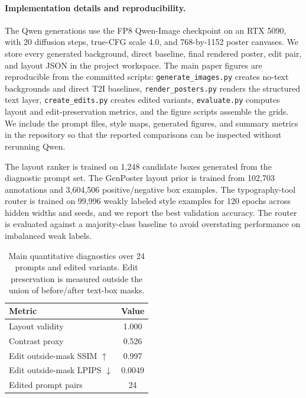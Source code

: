 \documentclass[10pt,twocolumn,letterpaper]{article}
\begin{document}
\paragraph{Implementation details and reproducibility.}
The Qwen generations use the FP8 Qwen-Image checkpoint on an RTX 5090, with 20 diffusion steps, true-CFG scale 4.0, and 768-by-1152 poster canvases. We store every generated background, direct baseline, final rendered poster, edit pair, and layout JSON in the project workspace. The main paper figures are reproducible from the committed scripts: \texttt{generate\_images.py} creates no-text backgrounds and direct T2I baselines, \texttt{render\_posters.py} renders the structured text layer, \texttt{create\_edits.py} creates edited variants, \texttt{evaluate.py} computes layout and edit-preservation metrics, and the figure scripts assemble the grids. We include the prompt files, style maps, generated figures, and summary metrics in the repository so that the reported comparisons can be inspected without rerunning Qwen.

The layout ranker is trained on 1,248 candidate boxes generated from the diagnostic prompt set. The GenPoster layout prior is trained from 102,703 annotations and 3,604,506 positive/negative box examples. The typography-tool router is trained on 99,996 weakly labeled style examples for 120 epochs across hidden widths and seeds, and we report the best validation accuracy. The router is evaluated against a majority-class baseline to avoid overstating performance on imbalanced weak labels.

\begin{table}[t]
    \centering
    \caption{Main quantitative diagnostics over 24 prompts and edited variants. Edit preservation is measured outside the union of before/after text-box masks.}
    \label{tab:main}
    \begin{tabular}{lc}
        \toprule
        Metric & Value \\
        \midrule
        Layout validity\footnotemark & 1.000 \\
        Contrast proxy & 0.526 \\
        Edit outside-mask SSIM $\uparrow$ & 0.997 \\
        Edit outside-mask LPIPS $\downarrow$ & 0.0049 \\
        Edited prompt pairs & 24 \\
        \bottomrule
    \end{tabular}
\end{table}
\end{document}
